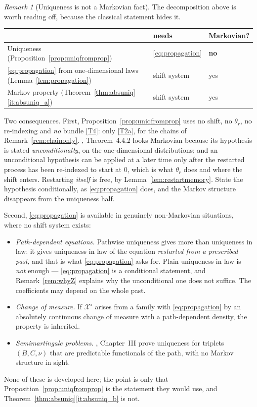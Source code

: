 \documentclass[11pt,a4paper]{article}
\theoremstyle{plain}
\theoremstyle{definition}
\theoremstyle{remark}
\newtheorem{remark}[theorem]{Remark}
\newcommand{\XX}{\mathcal{X}}                  %
\newcommand{\EK}{\cite{EK86}}
\newcommand{\JS}{\cite{JS03}}
\begin{document}
\begin{remark}[Uniqueness is not a Markovian fact]
  \label{rem:uniqnotmarkov}
  The decomposition above is worth reading off, because the classical statement
  hides it.
  \begin{center}
  \begin{tabular}{@{}lll@{}}
  \toprule
  & \textbf{needs} & \textbf{Markovian?} \\
  \midrule
  Uniqueness (Proposition~\ref{prop:uniqfromprop})
    & \eqref{eq:propagation} & \textbf{no} \\
  \eqref{eq:propagation} from one-dimensional laws (Lemma~\ref{lem:propagation})
    & shift system & yes \\
  Markov property (Theorem~\ref{thm:absuniq}\ref{it:absuniq_a})
    & shift system & yes \\
  \bottomrule
  \end{tabular}
  \end{center}

  Two consequences.  First, Proposition~\ref{prop:uniqfromprop} uses no shift,
  no $\theta_r$, no re-indexing and \emph{no} bundle \eqref{T4}: only \eqref{T2a}, for the
  chains of Remark~\ref{rem:chainonly}.  \EK, Theorem~4.4.2 looks Markovian
  because its hypothesis is stated \emph{unconditionally}, on the one-dimensional
  distributions; and an unconditional hypothesis can be applied at a later time
  only after the restarted process has been re-indexed to start at $0$, which is
  what $\theta_r$ does and where the shift enters.  Restarting \emph{itself} is
  free, by Lemma~\ref{lem:restartmemory}.  State the hypothesis conditionally, as
  \eqref{eq:propagation} does, and the Markov structure disappears from the
  uniqueness half.

  Second, \eqref{eq:propagation} is available in genuinely non-Markovian
  situations, where no shift system exists:
  \begin{itemize}
  \item \emph{Path-dependent equations.}  Pathwise uniqueness gives more than
    uniqueness in law: it gives uniqueness in law of the equation \emph{restarted
    from a prescribed past}, and that is what \eqref{eq:propagation} asks for.
    Plain uniqueness in law is \emph{not} enough --- \eqref{eq:propagation} is a
    conditional statement, and Remark~\ref{rem:whyZ} explains why the
    unconditional one does not suffice.  The coefficients may depend on the whole
    past.
  \item \emph{Change of measure.}  If $\XX^\circ$ arises from a family with
    \eqref{eq:propagation} by an absolutely continuous change of measure with a
    path-dependent density, the property is inherited.
  \item \emph{Semimartingale problems.}  \JS, Chapter~III prove uniqueness for
    triplets $(B,C,\nu)$ that are predictable functionals of the path, with no
    Markov structure in sight.
  \end{itemize}
  None of these is developed here; the point is only that
  Proposition~\ref{prop:uniqfromprop} is the statement they would use, and
  Theorem~\ref{thm:absuniq}\ref{it:absuniq_b} is not.
\end{remark}
\end{document}
